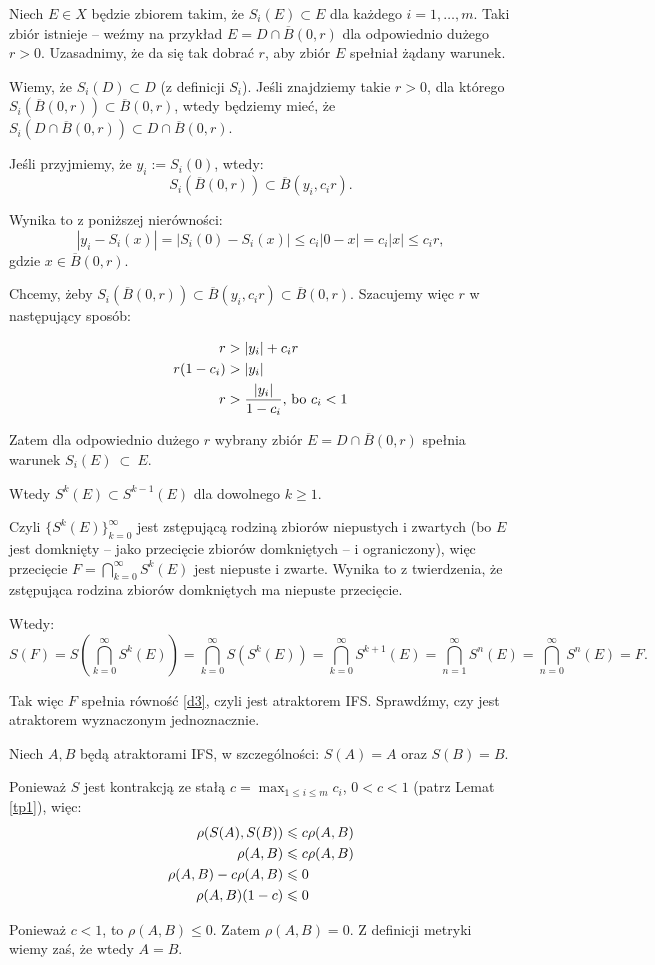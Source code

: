 \documentclass{mini}
\begin{document}
\begin{dow2}

Niech $E \in X$ będzie zbiorem takim, że $S_i(E) \subset E$ dla każdego $i=1,\ldots ,m$. Taki zbiór istnieje -- weźmy na przykład $E=D \cap \overline{B}(0,r)$ dla odpowiednio dużego $r>0$. Uzasadnimy, że da się tak dobrać $r$, aby zbiór $E$ spełniał żądany warunek.

Wiemy, że $S_i(D) \subset D$ (z definicji $S_i$). Jeśli znajdziemy takie $r>0$, dla którego $S_i(\overline{B}(0,r)) \subset \overline{B}(0,r)$, wtedy będziemy mieć, że $S_i(D \cap \overline{B}(0,r)) \subset D \cap \overline{B}(0,r)$.

Jeśli przyjmiemy, że $y_i:=S_i(0)$, wtedy:
$$
S_i(\overline{B}(0,r))\subset\overline{B}(y_i,c_ir).
$$

Wynika to z poniższej nierówności:
$$ 
|y_i-S_i(x)|=|S_i(0)-S_i(x)|\leqslant c_i|0-x|=c_i|x|\leqslant c_ir, 
$$
gdzie $x \in \overline{B}(0,r)$.

Chcemy, żeby $S_i(\overline{B}(0,r))\subset\overline{B}(y_i,c_ir)\subset\overline{B}(0,r)$. Szacujemy więc $r$ w następujący sposób:

$$
\aligned
r&> \vert y_i \vert + c_ir\\
r(1-c_i)&>\vert y_i \vert\\
r&>\frac{\vert y_i \vert}{1-c_i}\textrm{, bo }c_i<1
\endaligned
$$

Zatem dla odpowiednio dużego $r$ wybrany zbiór $E=D \cap \overline{B}(0,r)$ spełnia warunek $S_i(E)~\subset~E$.

Wtedy $S^k(E) \subset S^{k-1}(E)$ dla dowolnego $k \geqslant 1$.

Czyli $\lbrace S^k(E) \rbrace^{\infty}_{k=0}$ jest zstępującą rodziną zbiorów niepustych i zwartych (bo $E$ jest domknięty -- jako przecięcie zbiorów domkniętych -- i ograniczony), więc przecięcie $F = \bigcap^{\infty}_{k=0} S^k(E)$ jest niepuste i zwarte. Wynika to z twierdzenia, że zstępująca rodzina zbiorów domkniętych ma niepuste przecięcie.

Wtedy:
$$
S(F)=S\left(\bigcap^{\infty}_{k=0} S^k(E)\right)=\bigcap^{\infty}_{k=0} S(S^k(E))=\bigcap^{\infty}_{k=0} S^{k+1}(E)=\bigcap^{\infty}_{n=1} S^n(E)=\bigcap^{\infty}_{n=0} S^n(E)=F.
$$

Tak więc $F$ spełnia równość \eqref{d3}, czyli jest atraktorem IFS. Sprawdźmy, czy jest atraktorem  wyznaczonym jednoznacznie.

Niech $A,B$ będą atraktorami IFS, w szczególności: $S(A)=A$ oraz $S(B)=B$.

Ponieważ $S$ jest kontrakcją ze stałą $c=\max_{1\leqslant i\leqslant m}{c_i}$, $0<c<1$ (patrz Lemat~ \ref{tp1}), więc:
$$
\aligned
\rho(S(A),S(B))&\leqslant c\rho(A,B)\\
\rho(A,B) &\leqslant c\rho(A,B)\\
\rho(A,B)-c\rho(A,B)&\leqslant 0\\
\rho(A,B)(1-c)&\leqslant 0
\endaligned
$$

Ponieważ $c<1$, to $\rho(A,B)\leqslant 0$.
Zatem $\rho(A,B)=0$. Z definicji metryki wiemy zaś, że wtedy $A=B$.
\end{dow2}
\end{document}
